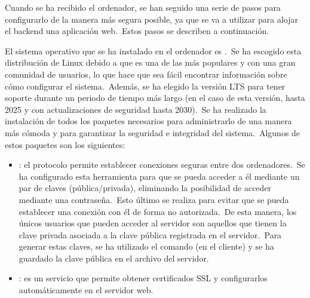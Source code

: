 Cuando se ha recibido el ordenador, se han seguido una serie de pasos para configurarlo de la manera más segura posible,
ya que se va a utilizar para alojar el backend una aplicación web.\ Estos pasos se describen a continuación.

El sistema operativo que se ha instalado en el ordenador es .\ Se ha escogido esta
distribución de Linux debido a que es una de las más populares y con una gran comunidad de usuarios, lo que
hace que sea fácil encontrar información sobre cómo configurar el sistema.\ Además, se ha elegido la versión LTS para
tener soporte durante un periodo de tiempo más largo (en el caso de esta versión, hasta 2025 y con actualizaciones de
seguridad hasta 2030).\ Se ha realizado la instalación de todos los paquetes necesarios para administrarlo de una
manera más cómoda y para garantizar la seguridad e integridad del sistema.\ Algunos de estos paquetes son los
siguientes:
\begin{itemize}
	\item {}: el protocolo  permite establecer conexiones seguras entre dos
	ordenadores.\ Se ha configurado esta herramienta para que se pueda acceder a él mediante un par de claves
	(pública/privada), eliminando la posibilidad de acceder mediante una contraseña.\ Esto último se realiza para
	evitar que se pueda establecer una conexión con él de forma no autorizada.\ De esta manera, los únicos usuarios
	que pueden acceder al servidor son aquellos que tienen la clave privada asociada a la clave pública registrada en
	el servidor.\ Para generar estas claves, se ha utilizado el comando  (en el cliente) y se ha
	guardado la clave pública en el archivo  del servidor.

	\item {}: es un servicio que permite obtener certificados SSL y configurarlos automáticamente en el
	servidor web.
\end{itemize}
\label{itm:os_packages}

